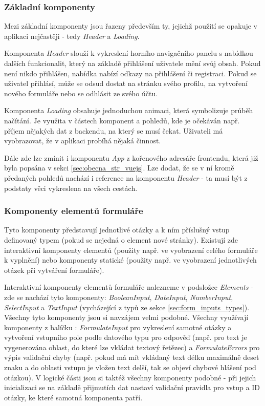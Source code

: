 		\subsubsection{Základní komponenty} \label{sec:komp_zakl} %
		Mezi základní komponenty jsou řazeny především ty, jejichž použití se opakuje v aplikaci nejčastěji - tedy \textit{Header} a \textit{Loading}. 
		
		Komponenta \textit{Header} slouží k vykreslení horního navigačního panelu s nabídkou dalších funkcionalit, který na základě přihlášení uživatele mění svůj obsah. Pokud není nikdo přihlášen, nabídka nabízí odkazy na přihlášení či registraci. Pokud se uživatel přihlásí, může se odsud dostat na stránku svého profilu, na vytvoření nového formuláře nebo se odhlásit ze svého účtu.
		
		Komponenta \textit{Loading} obsahuje jednoduchou animaci, která symbolizuje průběh načítání. Je využita v částech komponent a pohledů, kde je očekáván např. příjem nějakých dat z backendu, na který se musí čekat. Uživateli má vyobrazovat, že v aplikaci probíhá nějaká činnost.
		
		Dále zde lze zmínit i komponentu \textit{App} z kořenového adresáře frontendu, která již byla popsána v sekci \ref{sec:obecna_str_vuejs}. Lze dodat, že se v ní kromě předaných pohledů nachází i reference na komponentu \textit{Header} - ta musí být z podstaty věci vykreslena na všech cestách.
		
		\subsubsection{Komponenty elementů formuláře} \label{sec:komp_form} %
		Tyto komponenty představují jednotlivé otázky a k ním příslušný vstup definovaný typem (pokud se nejedná o element nové stránky). Existují zde interaktivní komponenty elementů (použity např. ve vyobrazení celého formuláře k vyplnění) nebo komponenty statické (použity např. ve vyobrazení jednotlivých otázek při vytváření formuláře).
		
		Interaktivní komponenty elementů formuláře nalezneme v podsložce \textit{Elements} - zde se nachází tyto komponenty: \textit{BooleanInput}, \textit{DateInput}, \textit{NumberInput}, \textit{SelectInput} a \textit{TextInput} (vycházející z typů ze sekce \ref{sec:form_inputs_types}). Všechny tyto komponenty jsou si navzájem velmi podobné. Všechny využívají komponenty z balíčku : \textit{FormulateInput} pro vykreslení samotné otázky a vytvoření vstupního pole podle datového typu pro odpověď (např. pro text je vygenerována oblast, do které lze vkládat textový řetězec) a \textit{FormulateErrors} pro výpis validační chyby (např. pokud má mít vkládaný text délku maximálně deset znaku a do oblasti vstupu je vložen text delší, tak se objeví chybové hlášení pod otázkou). V logické části jsou si taktéž všechny komponenty podobné - při jejich inicializaci se na základě přijmutích dat nastaví validační pravidla pro vstup a ID otázky, ke které samotná komponenta patří.
		
